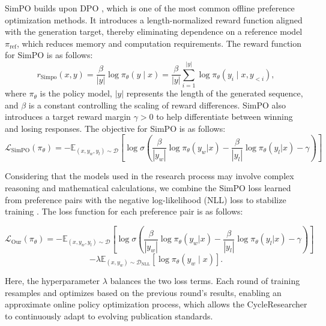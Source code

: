 \documentclass{article} %
\begin{document}
SimPO builds upon DPO \citep{rafailov2023direct}, which is one of the most common offline preference optimization methods. It introduces a length-normalized reward function aligned with the generation target, thereby eliminating dependence on a reference model $\pi_{\text{ref}}$, which reduces memory and computation requirements. The reward function for SimPO is as follows:
\begin{equation}
r_{\text{Simpo}}(x, y) = \frac{\beta}{|y|} \log \pi_\theta(y \mid x) = \frac{\beta}{|y|} \sum_{i=1}^{|y|} \log \pi_\theta(y_i \mid x, y_{<i}),
\end{equation}
where $\pi_\theta$ is the policy model, $|y|$ represents the length of the generated sequence, and $\beta$ is a constant controlling the scaling of reward differences. SimPO also introduces a target reward margin $\gamma > 0$ to help differentiate between winning and losing responses. The objective for SimPO is as follows: 
\begin{equation}
\mathcal{L}_{\text{SimPO}}(\pi_\theta) = -\mathbb{E}_{(x,y_w,y_l)\sim\mathcal{D}}\left[\log\sigma\left(\frac{\beta}{|y_w|}\log\pi_\theta(y_w|x) - \frac{\beta}{|y_l|}\log\pi_\theta(y_l|x) - \gamma\right)\right]
\end{equation}

Considering that the models used in the research process may involve complex reasoning and mathematical calculations, we combine the SimPO loss learned from preference pairs with the negative log-likelihood (NLL) loss to stabilize training \citep{pang2024iterative}. The loss function for each preference pair is as follows:

\begin{equation*}
\mathcal{L}_{\text{Our}}(\pi_\theta) = -\mathbb{E}_{(x,y_w,y_l)\sim\mathcal{D}}\left[\log\sigma\left(\frac{\beta}{|y_w|}\log\pi_\theta(y_w|x) - \frac{\beta}{|y_l|}\log\pi_\theta(y_l|x) - \gamma\right)\right]
\end{equation*}
\begin{equation}
- \lambda \mathbb{E}_{(x, y_w) \sim \mathcal{D}_{\text{NLL}}}\left[ \log \pi_\theta(y_w \mid x) \right].
\end{equation}

Here, the hyperparameter $\lambda$ balances the two loss terms. Each round of training resamples and optimizes based on the previous round’s results, enabling an approximate online policy optimization process, which allows the CycleResearcher to continuously adapt to evolving publication standards. 
\end{document}
